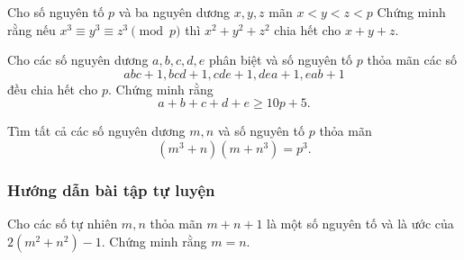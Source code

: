 \begin{btt}
Cho số nguyên tố $p$ và ba  nguyên dương $x, y, z$ mãn $x<y<z<p$ Chứng minh rằng nếu $x^{3} \equiv y^{3} \equiv z^{3} \pmod{p}$ thì $x^2+y^2+z^2$ chia hết cho $x+y+z.$
\end{btt}

\begin{btt}
Cho các số nguyên dương $a,b,c,d,e$ phân biệt và số nguyên tố $p$ thỏa mãn các số
$$abc+1,bcd+1,cde+1,dea+1,eab+1$$
đều chia hết cho $p.$ Chứng minh rằng
\[a+b+c+d+e\ge 10p+5.\]
\end{btt}

\begin{btt}
Tìm tất cả các số nguyên dương $m,n$ và số nguyên tố $p$ thỏa mãn $$\left(m^3+n\right)\left(m+n^3\right)=p^3.$$
\end{btt}

\subsubsection*{Hướng dẫn bài tập tự luyện}

\begin{gbtt}
Cho các số tự nhiên $m, n$ thỏa mãn $m+n+1$ là một số nguyên tố và là ước của $2\left(m^2+n^2\right)-1$. Chứng minh rằng $m=n.$
\end{gbtt}

